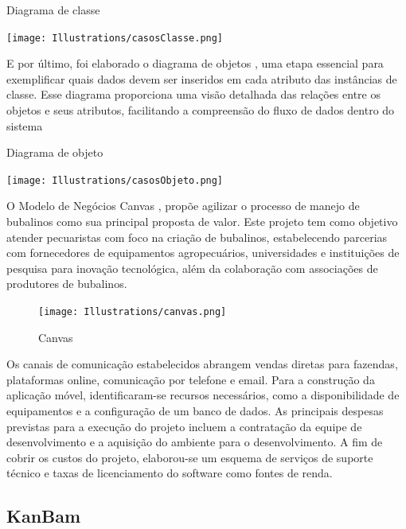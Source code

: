 \begin{flowchart}[!htb]
\centering
\caption{Diagrama de classe}%
\label{fcht:classe}
\texttt{[image: Illustrations/casosClasse.png]}
\end{flowchart}

E por último, foi elaborado o diagrama de objetos , uma etapa essencial para exemplificar quais dados devem ser inseridos em cada atributo das instâncias de classe. Esse diagrama proporciona uma visão detalhada das relações entre os objetos e seus atributos, facilitando a compreensão do fluxo de dados dentro do sistema

\begin{flowchart}[!htb]
\centering
\caption{Diagrama de objeto}%
\label{fcht:obejto}
\texttt{[image: Illustrations/casosObjeto.png]}
\end{flowchart}

O Modelo de Negócios Canvas , propõe agilizar o processo de manejo de bubalinos como sua principal proposta de valor. Este projeto tem como objetivo atender pecuaristas com foco na criação de bubalinos, estabelecendo parcerias com fornecedores de equipamentos agropecuários, universidades e instituições de pesquisa para inovação tecnológica, além da colaboração com associações de produtores de bubalinos.

\begin{figure}[!h]
\centering
\caption{Canvas}%
\label{fig:canvas}
\texttt{[image: Illustrations/canvas.png]}
\end{figure}

Os canais de comunicação estabelecidos abrangem vendas diretas para fazendas, plataformas online, comunicação por telefone e email.
Para a construção da aplicação móvel, identificaram-se recursos necessários, como a disponibilidade de equipamentos e a configuração de um banco de dados. As principais despesas previstas para a execução do projeto incluem a contratação da equipe de desenvolvimento e a aquisição do ambiente para o desenvolvimento.
A fim de cobrir os custos do projeto, elaborou-se um esquema de serviços de suporte técnico e taxas de licenciamento do software como fontes de renda.

\subsection*{KanBam}


